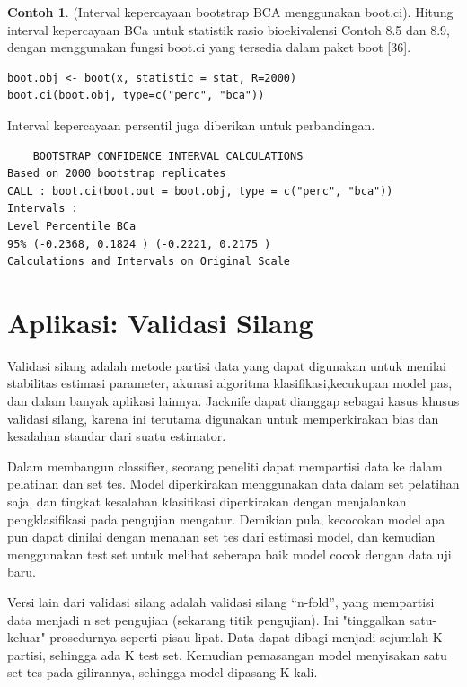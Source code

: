 \documentclass[a4paper,12pt]{article}
\theoremstyle{definition}
\newtheorem{example}{Contoh}[section]
\begin{document}
\begin{example}
(Interval kepercayaan bootstrap BCA menggunakan boot.ci). Hitung interval kepercayaan BCa untuk statistik rasio bioekivalensi Contoh 8.5 dan 8.9, dengan menggunakan fungsi boot.ci yang tersedia dalam paket boot [36].
\begin{lstlisting}
boot.obj <- boot(x, statistic = stat, R=2000)
boot.ci(boot.obj, type=c("perc", "bca"))
\end{lstlisting}    
Interval kepercayaan persentil juga diberikan untuk perbandingan.
\begin{lstlisting}
    BOOTSTRAP CONFIDENCE INTERVAL CALCULATIONS
Based on 2000 bootstrap replicates
CALL : boot.ci(boot.out = boot.obj, type = c("perc", "bca"))
Intervals :
Level Percentile BCa
95% (-0.2368, 0.1824 ) (-0.2221, 0.2175 )
Calculations and Intervals on Original Scale
\end{lstlisting}
\end{example}

\section{Aplikasi: Validasi Silang}
Validasi silang adalah metode partisi data yang dapat digunakan untuk menilai stabilitas estimasi parameter, akurasi algoritma klasifikasi,kecukupan model pas, dan dalam banyak aplikasi lainnya. Jacknife dapat dianggap sebagai kasus khusus validasi silang, karena ini terutama digunakan untuk memperkirakan bias dan kesalahan standar dari suatu estimator.

Dalam membangun classifier, seorang peneliti dapat mempartisi data ke dalam pelatihan dan set tes. Model diperkirakan menggunakan data dalam set pelatihan saja,
dan tingkat kesalahan klasifikasi diperkirakan dengan menjalankan pengklasifikasi pada pengujian mengatur. Demikian pula, kecocokan model apa pun dapat dinilai dengan menahan set tes dari estimasi model, dan kemudian menggunakan test set untuk melihat seberapa baik model cocok dengan data uji baru.

Versi lain dari validasi silang adalah validasi silang “n-fold”, yang mempartisi data menjadi n set pengujian (sekarang titik pengujian). Ini "tinggalkan satu-keluar" prosedurnya seperti pisau lipat. Data dapat dibagi menjadi sejumlah K partisi, sehingga ada K test set. Kemudian pemasangan model menyisakan satu set tes pada gilirannya, sehingga model dipasang K kali.
\end{document}
